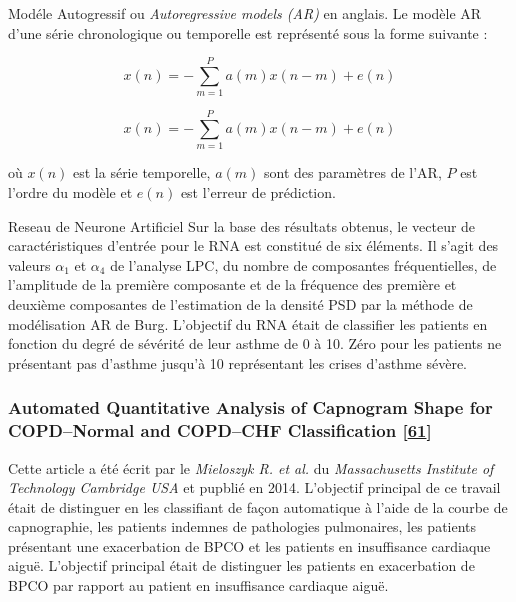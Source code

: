 \documentclass[12pt,]{article}
\begin{document}
Modéle Autogressif ou \emph{Autoregressive models (AR)} en anglais. Le
modèle AR d'une série chronologique ou temporelle est représenté sous la
forme suivante :

\[x(n)=-\sum_{m=1}^{P} a(m)x(n-m)+e(n)\]

\begin{equation}
    x(n)=-\sum_{m=1}^{P} a(m)x(n-m)+e(n)
\label{autoregresive model}
\end{equation}

où \(x(n)\) est la série temporelle, \(a(m)\) sont des paramètres de
l'AR, \(P\) est l'ordre du modèle et \(e(n)\) est l'erreur de
prédiction.

Reseau de Neurone Artificiel Sur la base des résultats obtenus, le
vecteur de caractéristiques d'entrée pour le RNA est constitué de six
éléments. Il s'agit des valeurs \(\alpha_{1}\) et \(\alpha_{4}\) de
l'analyse LPC, du nombre de composantes fréquentielles, de l'amplitude
de la première composante et de la fréquence des première et deuxième
composantes de l'estimation de la densité PSD par la méthode de
modélisation AR de Burg. L'objectif du RNA était de classifier les
patients en fonction du degré de sévérité de leur asthme de 0 à 10. Zéro
pour les patients ne présentant pas d'asthme jusqu'à 10 représentant les
crises d'asthme sévère.

\hypertarget{automated-quantitative-analysis-of-capnogram-shape-for-copdnormal-and-copdchf-classification-mieloszyk2014automated}{%
\subsubsection{\texorpdfstring{Automated Quantitative Analysis of
Capnogram Shape for COPD--Normal and COPD--CHF Classification
{[}\protect\hyperlink{ref-mieloszyk2014automated}{61}{]}}{Automated Quantitative Analysis of Capnogram Shape for COPD--Normal and COPD--CHF Classification ,{[}61{]}}}\label{automated-quantitative-analysis-of-capnogram-shape-for-copdnormal-and-copdchf-classification-mieloszyk2014automated}}

Cette article a été écrit par le \emph{Mieloszyk R. et al.} du
\emph{Massachusetts Institute of Technology Cambridge USA} et pupblié en
2014. L'objectif principal de ce travail était de distinguer en les
classifiant de façon automatique à l'aide de la courbe de capnographie,
les patients indemnes de pathologies pulmonaires, les patients
présentant une exacerbation de BPCO et les patients en insuffisance
cardiaque aiguë. L'objectif principal était de distinguer les patients
en exacerbation de BPCO par rapport au patient en insuffisance cardiaque
aiguë.
\end{document}
